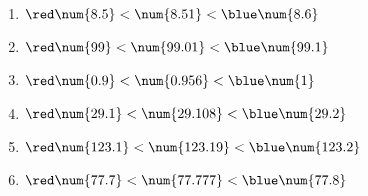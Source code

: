     \phantom{rrr}

    \begin{enumerate}
        \item ${\red\num{8.5  }} < \num{8.51  } < {\blue \num{8.6  }}$
        \item ${\red\num{99   }} < \num{99.01 } < {\blue \num{99.1 }}$
        \item ${\red\num{0.9  }} < \num{0.956 } < {\blue \num{1    }}$
        \item ${\red\num{29.1 }} < \num{29.108} < {\blue \num{29.2 }}$
        \item ${\red\num{123.1}} < \num{123.19} < {\blue \num{123.2}}$
        \item ${\red\num{77.7 }} < \num{77.777} < {\blue \num{77.8 }}$
    \end{enumerate}
